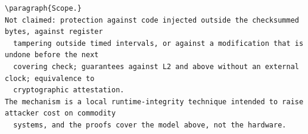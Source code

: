 \documentclass[9pt,twocolumn]{article}
\begin{document}
\begin{small}
\begin{verbatim}
\paragraph{Scope.}
Not claimed: protection against code injected outside the checksummed bytes, against register
  tampering outside timed intervals, or against a modification that is undone before the next
  covering check; guarantees against L2 and above without an external clock; equivalence to
  cryptographic attestation.
The mechanism is a local runtime-integrity technique intended to raise attacker cost on commodity
  systems, and the proofs cover the model above, not the hardware.
\end{verbatim}\end{small}
\end{document}
